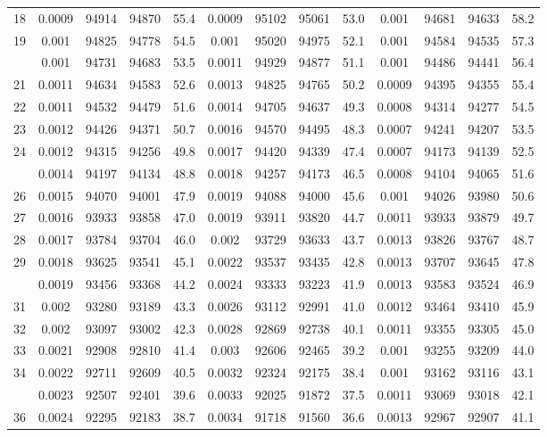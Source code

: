 \documentclass[
  14pt,
]{article}
\begin{document}
\begin{longtable}[t]{lcccccccccccc}
18 & 0.0009 & 94914 & 94870 & 55.4 & 0.0009 & 95102 & 95061 & 53.0 & 0.001 & 94681 & 94633 & 58.2\\
19 & 0.001 & 94825 & 94778 & 54.5 & 0.001 & 95020 & 94975 & 52.1 & 0.001 & 94584 & 94535 & 57.3\\
\addlinespace
20 & 0.001 & 94731 & 94683 & 53.5 & 0.0011 & 94929 & 94877 & 51.1 & 0.001 & 94486 & 94441 & 56.4\\
21 & 0.0011 & 94634 & 94583 & 52.6 & 0.0013 & 94825 & 94765 & 50.2 & 0.0009 & 94395 & 94355 & 55.4\\
22 & 0.0011 & 94532 & 94479 & 51.6 & 0.0014 & 94705 & 94637 & 49.3 & 0.0008 & 94314 & 94277 & 54.5\\
23 & 0.0012 & 94426 & 94371 & 50.7 & 0.0016 & 94570 & 94495 & 48.3 & 0.0007 & 94241 & 94207 & 53.5\\
24 & 0.0012 & 94315 & 94256 & 49.8 & 0.0017 & 94420 & 94339 & 47.4 & 0.0007 & 94173 & 94139 & 52.5\\
\addlinespace
25 & 0.0014 & 94197 & 94134 & 48.8 & 0.0018 & 94257 & 94173 & 46.5 & 0.0008 & 94104 & 94065 & 51.6\\
26 & 0.0015 & 94070 & 94001 & 47.9 & 0.0019 & 94088 & 94000 & 45.6 & 0.001 & 94026 & 93980 & 50.6\\
27 & 0.0016 & 93933 & 93858 & 47.0 & 0.0019 & 93911 & 93820 & 44.7 & 0.0011 & 93933 & 93879 & 49.7\\
28 & 0.0017 & 93784 & 93704 & 46.0 & 0.002 & 93729 & 93633 & 43.7 & 0.0013 & 93826 & 93767 & 48.7\\
29 & 0.0018 & 93625 & 93541 & 45.1 & 0.0022 & 93537 & 93435 & 42.8 & 0.0013 & 93707 & 93645 & 47.8\\
\addlinespace
30 & 0.0019 & 93456 & 93368 & 44.2 & 0.0024 & 93333 & 93223 & 41.9 & 0.0013 & 93583 & 93524 & 46.9\\
31 & 0.002 & 93280 & 93189 & 43.3 & 0.0026 & 93112 & 92991 & 41.0 & 0.0012 & 93464 & 93410 & 45.9\\
32 & 0.002 & 93097 & 93002 & 42.3 & 0.0028 & 92869 & 92738 & 40.1 & 0.0011 & 93355 & 93305 & 45.0\\
33 & 0.0021 & 92908 & 92810 & 41.4 & 0.003 & 92606 & 92465 & 39.2 & 0.001 & 93255 & 93209 & 44.0\\
34 & 0.0022 & 92711 & 92609 & 40.5 & 0.0032 & 92324 & 92175 & 38.4 & 0.001 & 93162 & 93116 & 43.1\\
\addlinespace
35 & 0.0023 & 92507 & 92401 & 39.6 & 0.0033 & 92025 & 91872 & 37.5 & 0.0011 & 93069 & 93018 & 42.1\\
36 & 0.0024 & 92295 & 92183 & 38.7 & 0.0034 & 91718 & 91560 & 36.6 & 0.0013 & 92967 & 92907 & 41.1\\

\end{longtable}
\end{document}
